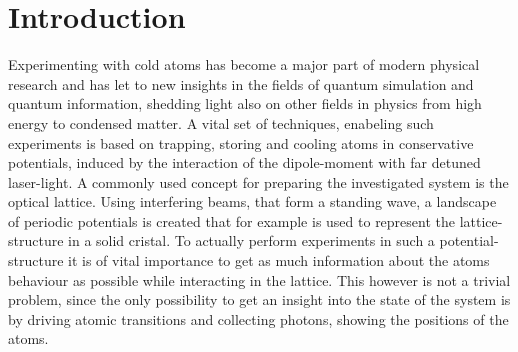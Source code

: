 \chapter{Introduction}

Experimenting with cold atoms has become a major part of modern physical research and has let to new insights in the fields of quantum simulation and quantum information, shedding light also on other fields in physics from high energy to condensed matter. A vital set of techniques, enabeling such experiments is based on trapping, storing and cooling atoms in conservative potentials, induced by the interaction of the dipole-moment with far detuned laser-light. A commonly used concept for preparing the investigated system is the optical lattice. Using interfering beams, that form a standing wave, a landscape of periodic potentials is created that for example is used to represent the lattice-structure in a solid cristal. To actually perform experiments in such a potential-structure it is of vital importance to get as much information about the atoms behaviour as possible while interacting in the lattice. This however is not a trivial problem, since the only possibility to get an insight into the state of the system is by driving atomic transitions and collecting photons, showing the positions of the atoms. 